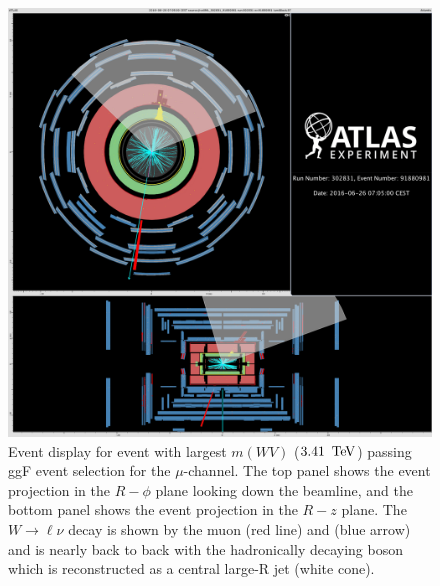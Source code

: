 \begin{figure}[h!tbp]
\begin{center}
\includegraphics[width=\linewidth]{figures/Appendix/highest_mu_candidate}
\caption[Event display for highest mass candidate (gluon-gluon fusion selection, $\mu$-channel)]{Event display for event with largest $m(WV)$ ($3.41\,\TeV$) passing ggF event selection for the $\mu$-channel. The top panel shows the event projection in the $R-\phi$ plane looking down the beamline, and the bottom panel shows the event projection in the $R-z$ plane. The $W\rightarrow \ell\nu$ decay is shown by the muon (red line) and \MET (blue arrow) and is nearly back to back with the hadronically decaying boson which is reconstructed as a central large-R jet (white cone).}
\end{center}
\label{fig:ggf_mu_ed}
\end{figure}

